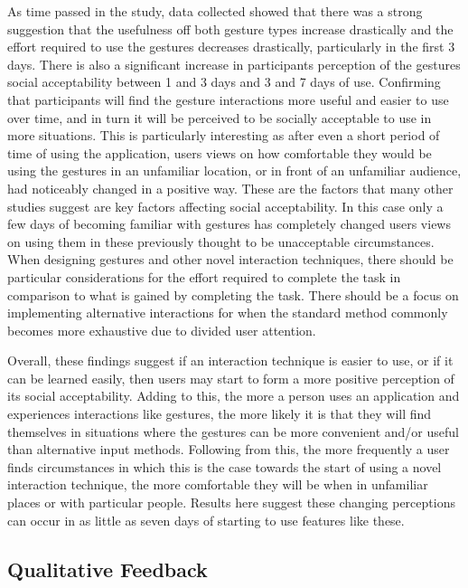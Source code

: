 \documentclass{l4proj}
\begin{document}
As time passed in the study, data collected showed that there was a strong suggestion that the usefulness off both gesture types increase drastically and the effort required to use the gestures decreases drastically, particularly in the first 3 days. There is also a significant increase in participants perception of the gestures social acceptability between 1 and 3 days and 3 and 7 days of use. Confirming that participants will find the gesture interactions more useful and easier to use over time, and in turn it will be perceived to be socially acceptable to use in more situations. This is particularly interesting as after even a short period of time of using the application, users views on how comfortable they would be using the gestures in an unfamiliar location, or in front of an unfamiliar audience, had noticeably changed in a positive way. These are the factors that many other studies \citep{rico_usable_2010, freeman_rhythmic_2017, ahlstrom_are_2014} suggest are key factors affecting social acceptability. In this case only a few days of becoming familiar with gestures has completely changed users views on using them in these previously thought to be unacceptable circumstances. When designing gestures and other novel interaction techniques, there should be particular considerations for the effort required to complete the task in comparison to what is gained by completing the task. There should be a focus on implementing alternative interactions for when the standard method commonly becomes more exhaustive due to divided user attention.

Overall, these findings suggest if an interaction technique is easier to use, or if it can be learned easily, then users may start to form a more positive perception of its social acceptability. Adding to this, the more a person uses an application and experiences interactions like gestures, the more likely it is that they will find themselves in situations where the gestures can be more convenient and/or useful than alternative input methods. Following from this, the more frequently a user finds circumstances in which this is the case towards the start of using a novel interaction technique, the more comfortable they will be when in unfamiliar places or with particular people. Results here suggest these changing perceptions can occur in as little as seven days of starting to use features like these.

\subsection{Qualitative Feedback}
\end{document}
